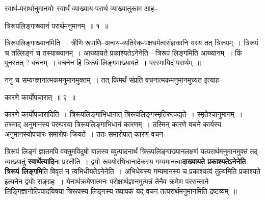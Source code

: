 \documentclass[article,12pt,a4paper]{memoir}
\begin{document}
	  \pstart स्वार्थ-परार्थानुमानयोः स्वार्थं व्याख्याय परार्थ व्याख्यातुकाम आह--
	\pend
        
	  \bigskip
	  \begingroup
	

	  \pstart त्रिरूपलिङ्गाख्यानं परार्थमनुमानम् ॥ १ ॥
	\pend
      
	  \endgroup
	 

	  \pstart त्रिरूपलिङ्गाख्यानमिति । त्रीणि रूपाणि--अन्वय-व्यतिरेक-पक्षधर्मत्वसंज्ञकानि यस्य तत् त्रिरूपम् । त्रिरूपं च तल्लिङ्गं च तस्याख्यानम् । आख्यायते प्रकाश्यतेऽनेनेति—त्रिरूपं लिङ्गमिति आख्यानम् । किं पुनस्तत् ? वचनम् । वचनेन हि त्रिरूपं लिङ्गमाख्यायते । परस्मायिदं परार्थम् ॥
	\pend
        

	  \pstart ननु च सम्यग्ज्ञानात्मकमनुमानमुक्तम् । तत् किमर्थं संप्रति वचनात्मकमनुमानमुच्यत इत्याह--
	\pend
        
	  \bigskip
	  \begingroup
	

	  \pstart कारणे कार्योपचारात् ॥ २ ॥
	\pend
      
	  \endgroup
	 

	  \pstart कारणे कार्योपचारादिति । त्रिरूपलिङ्गाभिधानात् त्रिरूपलिङ्गस्मृतिरुत्पद्यते । स्मृतेश्चानुमानम् । तस्माद् अनुमानस्य परम्परया त्रिरूपलिङ्गाभिधानं कारणम् । तस्मिन् कारणे वचने कार्यस्य अनुमानस्योपचारः समारोपः क्रियते । ततः समारोपात् कारणं वचन-
	\pend
      
	  \endgroup
	

	  \pstart त्रिरूपं लिङ्गं ज्ञातमपि वक्तुमविदुषो बालस्य व्युत्पादनार्थं त्रिरूपलिङ्गाख्यानलक्षणं यत्परार्थमनुमानमुक्तं तद् व्याख्यातुं \textbf{स्वार्थेत्यादि}ना प्रस्तौति । द्वयो रूपयोरभिधानादेकस्य गम्यमानत्वा\textbf{दाख्यायते प्रकाश्यतेऽनेनेति त्रिरूपं लिङ्गमि}ति विवृतं न त्वभिधीयतेऽनेनेति । अभिधेयस्य गम्यमानस्य च प्रकाश्यत्वं तुल्यमिति प्रकाश्यते इत्यनेन द्वयोः सङ्ग्रहः । येनार्थक्रमेणात्मनः परोक्षार्थज्ञानमुत्पन्नं तेनैव क्रमेण परसन्ताने लिङ्गिज्ञानोत्पिपादयिषया त्रिरूपस्य लिङ्गस्य ख्यापकं यद् वचनं तत्परार्थमनुमानमिति द्रष्टव्यम् ॥
	\pend
      
\end{document}
